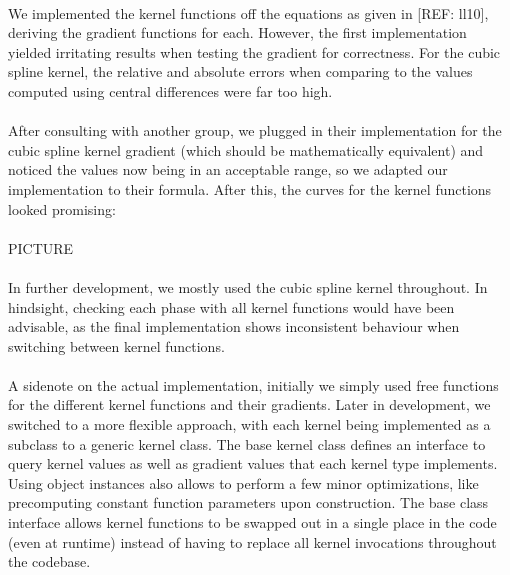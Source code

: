 \documentclass{ACGSeminar}
\begin{document}
\\
We implemented the kernel functions off the equations as given in [REF: ll10], deriving the gradient functions for each. However, the first implementation yielded irritating results when testing the gradient for correctness. For the cubic spline kernel, the relative and absolute errors when comparing to the values computed using central differences were far too high. \\
\\
After consulting with another group, we plugged in their implementation for the cubic spline kernel gradient (which should be mathematically equivalent) and noticed the values now being in an acceptable range, so we adapted our implementation to their formula. After this, the curves for the kernel functions looked promising:\\
\\
PICTURE\\
\\
In further development, we mostly used the cubic spline kernel throughout. In hindsight, checking each phase with all kernel functions would have been advisable, as the final implementation shows inconsistent behaviour when switching between kernel functions.\\
\\
A sidenote on the actual implementation, initially we simply used free functions for the different kernel functions and their gradients. Later in development, we switched to a more flexible approach, with each kernel being implemented as a subclass to a generic kernel class. The base kernel class defines an interface to query kernel values as well as gradient values that each kernel type implements. Using object instances also allows to perform a few minor optimizations, like precomputing constant function parameters upon construction. The base class interface allows kernel functions to be swapped out in a single place in the code (even at runtime) instead of having to replace all kernel invocations throughout the codebase.\\
\\
\end{document}
